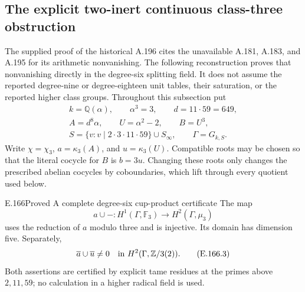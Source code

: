 \subsection{The explicit two-inert continuous class-three obstruction}

The supplied proof of the historical A.196 cites the unavailable
A.181, A.183, and A.195 for its arithmetic nonvanishing.  The following
reconstruction proves that nonvanishing directly in the degree-six
splitting field.  It does not assume the reported degree-nine or
degree-eighteen unit tables, their saturation, or the reported higher
class groups.  Throughout this subsection put
\[
\begin{gathered}
 k=\mathbb Q(\alpha),\qquad \alpha^3=3,\qquad d=11\cdot59=649,\\
 A=d^8\alpha,\qquad U=\alpha^2-2,\qquad B=U^3,\\
 S=\{v:v\mid2\cdot3\cdot11\cdot59\}\cup S_\infty,
 \qquad \Gamma=G_{k,S}.
\end{gathered}
\tag{E.166.1}
\]
Write \(\chi=\chi_3\), \(a=\kappa_3(A)\), and
\(u=\kappa_3(U)\).  Compatible roots may be chosen so that the
literal cocycle for \(B\) is \(b=3u\).  Changing these roots only
changes the prescribed abelian cocycles by coboundaries, which lift
through every quotient used below.

\begin{result}{E.166}{Proved}
{A complete degree-six cup-product certificate}
The map
\[
 a\cup-:H^1(\Gamma,\mathbb F_3)
       \longrightarrow H^2(\Gamma,\mu_3)
\tag{E.166.2}
\]
uses the reduction of \(a\) modulo three and is injective.
Its domain has dimension five.  Separately,
\[
 \overline a\cup\overline u\ne0
       \quad\hbox{in }H^2(\Gamma,\mathbb Z/3(2)).
\tag{E.166.3}
\]
Both assertions are certified by explicit tame residues at the primes
above \(2,11,59\); no calculation in a higher radical field is used.
\end{result}

